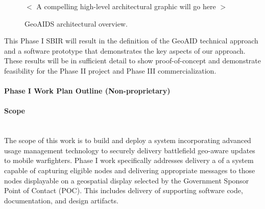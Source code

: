 \documentclass{sbir}
\begin{document}

\begin{figure}
 \vspace{1in}
 \begin{center}
  $<$ A compelling high-level architectural graphic will go here $>$
  \end{center}
 \vspace{1in}
  \caption{GeoAIDS architectural overview.}\label{GeoAIDarch}
 \end{figure}

\newpage 
\pagestyle{nonproprietary}

{This Phase I SBIR will result in the definition of the GeoAID technical approach and a software prototype that demonstrates the key aspects of our approach. These results will be in sufficient detail to show proof-of-concept and demonstrate feasibility for the Phase II project and Phase III commercialization.}

\paragraph{Phase I Work Plan Outline (Non-proprietary)}
\paragraph{Scope}~\\
The scope of this work is to build and deploy a system incorporating advanced usage management technology to securely delivery battlefield geo-aware updates to mobile warfighters. Phase I work specifically addresses delivery a of a system capable of capturing eligible nodes and delivering appropriate messages to those nodes displayable on a geospatial display selected by the Government Sponsor Point of Contact (POC). This includes delivery of supporting software code, documentation, and design artifacts.
\end{document}
